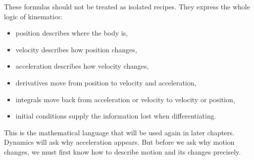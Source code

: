These formulas should not be treated as isolated recipes. They express the whole logic of kinematics:

\begin{itemize}
    \item position describes where the body is,
    \item velocity describes how position changes,
    \item acceleration describes how velocity changes,
    \item derivatives move from position to velocity and acceleration,
    \item integrals move back from acceleration or velocity to velocity or position,
    \item initial conditions supply the information lost when differentiating.
\end{itemize}

This is the mathematical language that will be used again in later chapters. Dynamics will ask why acceleration appears. But before we ask why motion changes, we must first know how to describe motion and its changes precisely.
